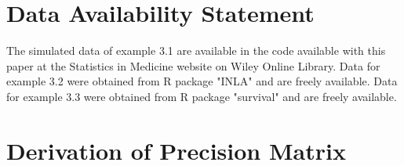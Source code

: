 \documentclass[ba]{imsart}
\begin{document}
\section*{Data Availability Statement}
The simulated data of example 3.1 are available in the code available with this paper at the Statistics in Medicine website on Wiley Online Library.
Data for example 3.2 were obtained from R package "INLA" \citep{inla} and are freely available.
Data for example 3.3 were obtained from R package "survival" \citep{survival-package} and are freely available. 

\appendix

\section{Derivation of Precision Matrix}
\end{document}
